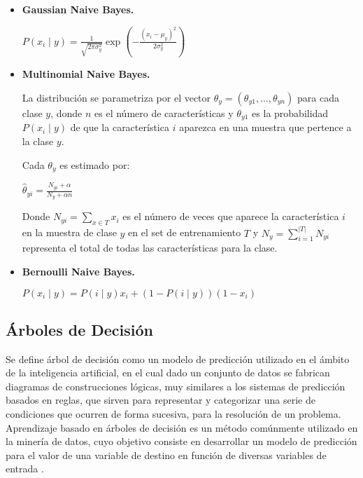 \begin{itemize}
	
	\item \textbf{Gaussian Naive Bayes.}
	
	\begin{center}
		$P(x_i \mid y) = \frac{1}{\sqrt{2\pi\sigma^2_y}} \exp\left(-\frac{(x_i - \mu_y)^2}{2\sigma^2_y}\right)$
	\end{center}
	
	\item \textbf{Multinomial Naive Bayes.}
	
	La distribución se parametriza por el vector $\theta_y = (\theta_{y1},\ldots,\theta_{yn})$ para cada clase $y$, donde $n$ es el número de características y $\theta_{y1}$ es la probabilidad $P(x_i \mid y)$ de que la característica $i$ aparezca en una muestra que pertence a la clase $y$.
	
	Cada $\theta_y$ es estimado por:
	
	\begin{center}
		
		$\hat{\theta}_{yi} = \frac{ N_{yi} + \alpha}{N_y + \alpha n}$		
	\end{center}
	
	Donde $N_{yi} = \sum_{x \in T} x_i$ es el número  de veces que aparece la característica $i$ en la muestra de clase $y$ en el set de entrenamiento $T$ y $N_{y} = \sum_{i=1}^{|T|} N_{yi}$ representa el total de todas las características para la clase.
	
	\item \textbf{Bernoulli Naive Bayes.}
	
	\begin{center}
		$P(x_i \mid y) = P(i \mid y) x_i + (1 - P(i \mid y)) (1 - x_i)$
	\end{center}
	
\end{itemize}

\subsection{Árboles de Decisión}

Se define árbol de  decisión como un modelo de predicción utilizado en el ámbito de la inteligencia artificial, en el cual  dado un conjunto de datos se fabrican diagramas de construcciones lógicas, muy similares a los sistemas de predicción basados en reglas, que sirven para representar y categorizar una serie de condiciones que ocurren de forma sucesiva, para la resolución de un problema.  Aprendizaje basado en árboles de decisión es un método comúnmente utilizado en la minería de datos, cuyo objetivo consiste en desarrollar un modelo de predicción para el valor de una variable de destino en función de diversas variables de entrada \cite{freund1999alternating}.

